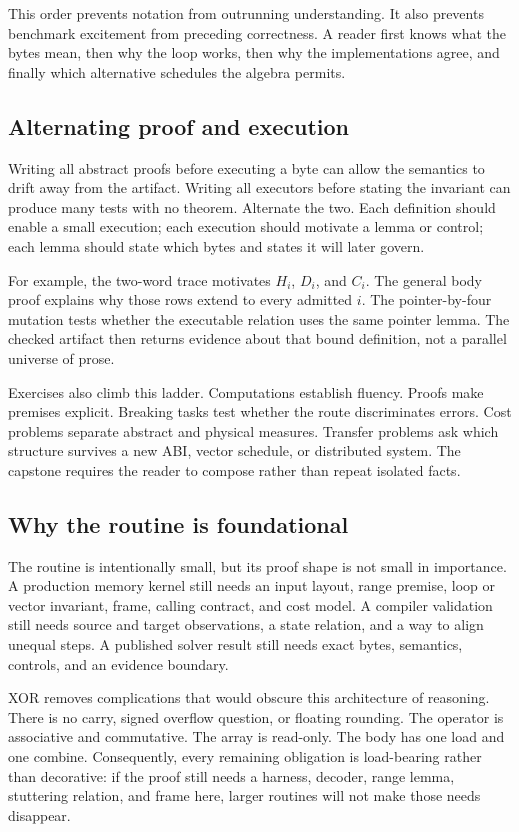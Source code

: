 This order prevents notation from outrunning understanding. It also prevents
benchmark excitement from preceding correctness. A reader first knows what
the bytes mean, then why the loop works, then why the implementations agree,
and finally which alternative schedules the algebra permits.

\subsection{Alternating proof and execution}

Writing all abstract proofs before executing a byte can allow the semantics to
drift away from the artifact. Writing all executors before stating the
invariant can produce many tests with no theorem. Alternate the two. Each
definition should enable a small execution; each execution should motivate a
lemma or control; each lemma should state which bytes and states it will later
govern.

For example, the two-word trace motivates \(H_i\), \(D_i\), and \(C_i\).
The general body proof explains why those rows extend to every admitted
\(i\). The pointer-by-four mutation tests whether the executable relation uses
the same pointer lemma. The checked artifact then returns evidence about that
bound definition, not a parallel universe of prose.

Exercises also climb this ladder. Computations establish fluency. Proofs make
premises explicit. Breaking tasks test whether the route discriminates errors.
Cost problems separate abstract and physical measures. Transfer problems ask
which structure survives a new ABI, vector schedule, or distributed system.
The capstone requires the reader to compose rather than repeat isolated facts.

\subsection{Why the routine is foundational}

The routine is intentionally small, but its proof shape is not small in
importance. A production memory kernel still needs an input layout, range
premise, loop or vector invariant, frame, calling contract, and cost model. A
compiler validation still needs source and target observations, a state
relation, and a way to align unequal steps. A published solver result still
needs exact bytes, semantics, controls, and an evidence boundary.

XOR removes complications that would obscure this architecture of reasoning.
There is no carry, signed overflow question, or floating rounding. The
operator is associative and commutative. The array is read-only. The body has
one load and one combine. Consequently, every remaining obligation is
load-bearing rather than decorative: if the proof still needs a harness,
decoder, range lemma, stuttering relation, and frame here, larger routines will
not make those needs disappear.

